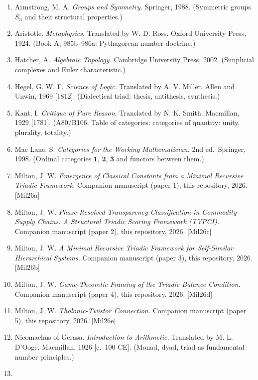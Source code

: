 \documentclass[12pt]{article}
\providecommand{\tightlist}{%
  \setlength{\itemsep}{0pt}\setlength{\parskip}{0pt}}
\begin{document}
\begin{enumerate}
\def\labelenumi{\arabic{enumi}.}
\tightlist
\item
  Armstrong, M. A. \emph{Groups and Symmetry.} Springer, 1988.
  (Symmetric groups \(S_n\) and their structural properties.)
\item
  Aristotle. \emph{Metaphysics.} Translated by W. D. Ross. Oxford
  University Press, 1924. (Book A, 985b--986a: Pythagorean number
  doctrine.)
\item
  Hatcher, A. \emph{Algebraic Topology.} Cambridge University Press,
  2002. (Simplicial complexes and Euler characteristic.)
\item
  Hegel, G. W. F. \emph{Science of Logic.} Translated by A. V. Miller.
  Allen and Unwin, 1969 {[}1812{]}. (Dialectical triad: thesis,
  antithesis, synthesis.)
\item
  Kant, I. \emph{Critique of Pure Reason.} Translated by N. K. Smith.
  Macmillan, 1929 {[}1781{]}. (A80/B106: Table of categories; categories
  of quantity: unity, plurality, totality.)
\item
  Mac Lane, S. \emph{Categories for the Working Mathematician.} 2nd
  ed.~Springer, 1998. (Ordinal categories \(\mathbf{1}\),
  \(\mathbf{2}\), \(\mathbf{3}\) and functors between them.)
\item
  Milton, J. W. \emph{Emergence of Classical Constants from a Minimal
  Recursive Triadic Framework.} Companion manuscript (paper 1), this
  repository, 2026. {[}Mil26a{]}
\item
  Milton, J. W. \emph{Phase-Resolved Transparency Classification in
  Commodity Supply Chains: A Structural Triadic Scoring Framework
  (TVPCI).} Companion manuscript (paper 2), this repository, 2026.
  {[}Mil26c{]}
\item
  Milton, J. W. \emph{A Minimal Recursive Triadic Framework for
  Self-Similar Hierarchical Systems.} Companion manuscript (paper 3),
  this repository, 2026. {[}Mil26b{]}
\item
  Milton, J. W. \emph{Game-Theoretic Framing of the Triadic Balance
  Condition.} Companion manuscript (paper 4), this repository, 2026.
  {[}Mil26d{]}
\item
  Milton, J. W. \emph{Tholonic-Twistor Connection.} Companion manuscript
  (paper 5), this repository, 2026. {[}Mil26e{]}
\item
  Nicomachus of Gerasa. \emph{Introduction to Arithmetic.} Translated by
  M. L. D'Ooge. Macmillan, 1926 {[}c.~100 CE{]}. (Monad, dyad, triad as
  fundamental number principles.)
\item

\end{enumerate}
\end{document}
